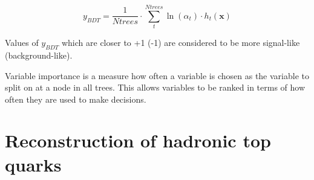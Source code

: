 \begin{equation}
y_{BDT} = \frac{1}{Ntrees} \cdot \sum_{t}^{Ntrees} \ln \left(\alpha_{t}\right) \cdot h_{t}\left(\textbf{x}\right)
\end{equation}

Values of $y_{BDT}$ which are closer to +1 (-1) are considered to be more signal-like (background-like).

Variable importance is a measure how often a variable is chosen as the variable to split on at a node in all trees. This allows variables to be ranked in terms of how often they are used to make decisions.

\section{Reconstruction of hadronic top quarks \label{sec:topreco}}

